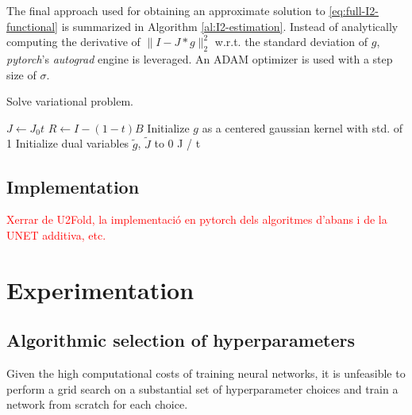 \documentclass[twocolumn,twoside,a4paper,10pt]{IEEEtran}
\newcommand{\Frank}[1]{\textcolor{red}{#1}}
\begin{document}
The final approach used for obtaining an approximate solution to \cref{eq:full-I2-functional} is summarized in Algorithm \ref{al:I2-estimation}. Instead of analytically computing the derivative of \(\|I-J\ast g\|_2^2\) w.r.t. the standard deviation of \(g\), \textit{pytorch}'s \textit{autograd} engine is leveraged. An ADAM optimizer is used with a step size of \(\sigma\).

\begin{algorithm}\caption{Solve variational problem.}
\label{al:I2-estimation}
\(J\gets J_0t\)\;
\(R\gets I - (1-t)B\)\;
Initialize \(g\) as a centered gaussian kernel with std. of 1\; 
Initialize dual variables \(\tilde{g}\), \(\tilde{J}\) to 0\;
\Return J / t
\end{algorithm}

\subsection{Implementation}
\Frank{Xerrar de U2Fold, la implementació en pytorch dels algoritmes d'abans i de la UNET additiva, etc.}
\section{Experimentation}
\subsection{Algorithmic selection of hyperparameters}
Given the high computational costs of training neural networks, it is unfeasible to perform a grid search on a substantial set of hyperparameter choices and train a network from scratch for each choice.
\end{document}
